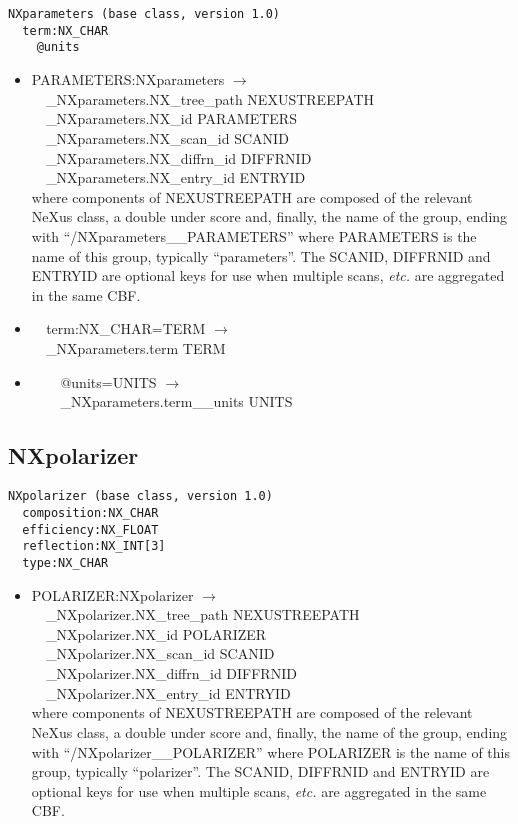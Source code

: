 \documentclass[11pt]{article}
\begin{document}
{{\begin{verbatim}
NXparameters (base class, version 1.0)
  term:NX_CHAR
    @units
\end{verbatim}

\begin{itemize}

\item{PARAMETERS:NXparameters $\rightarrow$\\
\verb|  |\_NXparameters.NX\_tree\_path    NEXUSTREEPATH \\
\verb|  |\_NXparameters.NX\_id            PARAMETERS\\
\verb|  |\_NXparameters.NX\_scan\_id      SCANID \\
\verb|  |\_NXparameters.NX\_diffrn\_id    DIFFRNID \\
\verb|  |\_NXparameters.NX\_entry\_id     ENTRYID \\
where components of NEXUSTREEPATH are composed of the
relevant NeXus class, a double under score and, finally, the
name of the group, ending with ``/NXparameters\_\_PARAMETERS''
where PARAMETERS is the name of this group, typically ``parameters''.
The SCANID, DIFFRNID and ENTRYID are optional keys for use
when multiple scans, {\it etc.} are aggregated in the same CBF.}

\item{\verb|  |term:NX\_CHAR=TERM $\rightarrow$\\
\verb|  |\_NXparameters.term TERM}

\item{\verb|    |@units=UNITS $\rightarrow$\\
\verb|    |\_NXparameters.term\_\_units UNITS}
\end{itemize}
\subsection{NXpolarizer}

\begin{verbatim}
NXpolarizer (base class, version 1.0)
  composition:NX_CHAR
  efficiency:NX_FLOAT
  reflection:NX_INT[3]
  type:NX_CHAR
\end{verbatim}

\begin{itemize}

\item{POLARIZER:NXpolarizer $\rightarrow$\\
\verb|  |\_NXpolarizer.NX\_tree\_path    NEXUSTREEPATH \\
\verb|  |\_NXpolarizer.NX\_id            POLARIZER\\
\verb|  |\_NXpolarizer.NX\_scan\_id      SCANID \\
\verb|  |\_NXpolarizer.NX\_diffrn\_id    DIFFRNID \\
\verb|  |\_NXpolarizer.NX\_entry\_id     ENTRYID \\
where components of NEXUSTREEPATH are composed of the
relevant NeXus class, a double under score and, finally, the
name of the group, ending with ``/NXpolarizer\_\_POLARIZER''
where POLARIZER is the name of this group, typically ``polarizer''.
The SCANID, DIFFRNID and ENTRYID are optional keys for use
when multiple scans, {\it etc.} are aggregated in the same CBF.}


\end{itemize}}}
\end{document}

